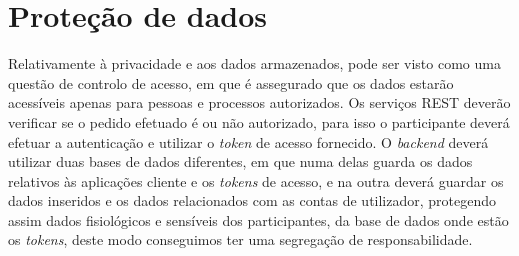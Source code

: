 \section{Proteção de dados}
\label{cap6:protecaodados}
Relativamente à privacidade e aos dados armazenados, pode ser visto como uma questão de controlo de acesso, em que é assegurado que os dados estarão acessíveis apenas para pessoas e processos autorizados. Os serviços \gls{REST} deverão verificar se o pedido efetuado é ou não autorizado, para isso o participante deverá efetuar a autenticação e utilizar o \textit{token} de acesso fornecido. O \textit{backend} deverá utilizar duas bases de dados diferentes, em que numa delas guarda os dados relativos às aplicações cliente e os \textit{tokens} de acesso, e na outra deverá guardar os dados inseridos e os dados relacionados com as contas de utilizador, protegendo assim dados fisiológicos e sensíveis dos participantes, da base de dados onde estão os \textit{tokens}, deste modo conseguimos ter uma segregação de responsabilidade.

\cleardoublepage
